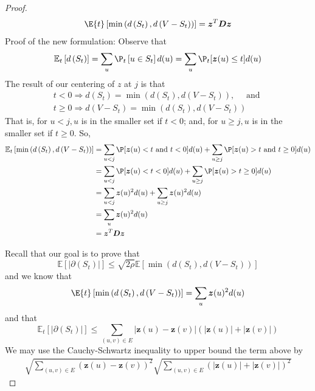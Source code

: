 \documentclass{article}
\begin{document}
\begin{proof}
$$
\E{t}\left[\min \left(d\left(S_{t}\right), d\left(V-S_{t}\right)\right)\right]=\boldsymbol{z}^{T} \boldsymbol{D} \boldsymbol{z}
$$
Proof of the new formulation: Observe that
$$
\mathbb{E}_{t}\left[d\left(S_{t}\right)\right]=\sum_{u} \P_{t}\left[u \in S_{t}\right] d(u)=\sum_{u} \P_{t}[\boldsymbol{z}(u) \leq t] d(u)
$$
The result of our centering of $z$ at $j$ is that
$$
\begin{array}{l}
t<0 \Longrightarrow d(S_t)=\min (d(S_t), d(V-S_t)), \quad \text { and } \\
t \geq 0 \Longrightarrow d(V-S_t)=\min (d(S_t), d(V-S_t))
\end{array}
$$
That is, for $u<j, u$ is in the smaller set if $t<0$; and, for $u \geq j, u$ is in the smaller set if $t \geq 0$. So,
$$
\begin{aligned}
\mathbb{E}_{t}\left[\min \left(d\left(S_{t}\right), d\left(V-S_{t}\right)\right)\right] &=\sum_{u<j} \P[\boldsymbol{z}(u)<t \text { and } t<0] d(u)+\sum_{u \geq j} \P[\boldsymbol{z}(u)>t \text { and } t \geq 0] d(u) \\
&=\sum_{u<j} \P[\boldsymbol{z}(u)<t<0] d(u)+\sum_{u \geq j} \P[\boldsymbol{z}(u)>t \geq 0] d(u) \\
&=\sum_{u<j} \boldsymbol{z}(u)^{2} d(u)+\sum_{u \geq j} \boldsymbol{z}(u)^{2} d(u) \\
&=\sum_{u} \boldsymbol{z}(u)^{2} d(u) \\
&=\boldsymbol{z}^{T} \boldsymbol{D} \boldsymbol{z}
\end{aligned}
$$


Recall that our goal is to prove that
$$
\mathbb{E}\left[\left|\partial\left(S_{t}\right)\right|\right] \leq \sqrt{2 \rho} \mathbb{E}\left[\min \left(d\left(S_{t}\right), d\left(V-S_{t}\right)\right)\right]
$$
and we know that
$$
\E{t}\left[\min \left(d\left(S_{t}\right), d\left(V-S_{t}\right)\right)\right]=\sum_{u} \boldsymbol{z}(u)^{2} d(u)
$$
and that
$$
\mathbb{E}_{t}\left[\left|\partial\left(S_{t}\right)\right|\right] \leq \sum_{(u, v) \in E}|\boldsymbol{z}(u)-\boldsymbol{z}(v)|(|\boldsymbol{z}(u)|+|\boldsymbol{z}(v)|)
$$
We may use the Cauchy-Schwartz inequality to upper bound the term above by
\begin{align}
    \sqrt{\sum_{(u, v) \in E}(\boldsymbol{z}(u)-\boldsymbol{z}(v))^{2}} \sqrt{\sum_{(u, v) \in E}(|\boldsymbol{z}(u)|+|\boldsymbol{z}(v)|)^{2}}\label{eq:dd}
\end{align}




\end{proof}
\end{document}
